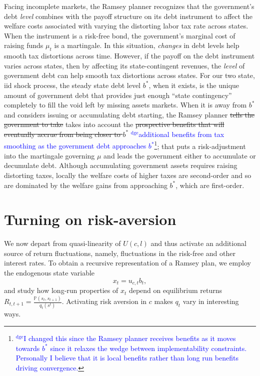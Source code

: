 \documentclass[12pt]{article}
\newcommand{\dge}[1]{\textcolor{blue}{$^{\textrm{dge}}${#1}}}
\begin{document}
	  Facing incomplete markets, the  Ramsey planner recognizes that   the government's debt {\em level} combines with  the
 payoff structure on its debt instrument to affect  the welfare costs associated with varying the distorting labor tax rate across states.  When the
  instrument is a risk-free bond, the government's marginal cost of raising funds $\mu_t$ is  a martingale. In this situation,
    {\em changes} in debt levels  help smooth tax distortions across time. 		
	However, if the  payoff on the debt instrument varies across states, then  by affecting its state-contingent revenues, the {\em level} of government debt can help smooth tax distortions across states.
	For our two state, iid shock process,  the steady state debt level $b^*$, when it exists, is the unique amount of government debt
that provides just enough ``state contingency'' completely to fill the void left by  missing assets markets.	
	When it is away from $b^*$ and  considers issuing or accumulating debt starting,  the Ramsey planner \st{tells the government to take} takes into account
the \st{prospective benefits that will eventually accrue from being closer to $b^*$} \dge{additional benefits from tax smoothing as the government debt approaches $b^*$}\footnote{\dge{I changed this since the Ramsey planner receives benefits as it moves towards $b^*$ since it relaxes the wedge between implementability constraints.  Personally I believe that it is local benefits rather than long run benefits driving convergence.}};  that puts a risk-adjustment into the martingale governing $\mu$ and leads the
 government either to accumulate or decumulate debt.	
	 Although accumulating government assets requires  raising distorting  taxes, locally  the welfare costs of higher taxes are second-order and
so are  dominated by the welfare gains from approaching  $b^*$, which are first-order.



\section{Turning on risk-aversion}

  We now depart from quasi-linearity of $U(c,l)$ and thus activate an additional source of return fluctuations, namely,
  fluctuations in the risk-free and other interest rates.  To obtain a recursive representation of a Ramsey plan,
  we employ the endogenous state variable
  \[x_t=u_{c,t}b_{t} ,\]
  and study how long-run properties of $x_t$ depend on equilibrium returns $R_{t,t+1}=\frac{\mathbb{P}(s_t,s_{t+1})}{q_t(s^t)}$.
   Activating risk aversion in $c$ makes $q_t$ vary in interesting ways.
\end{document}
